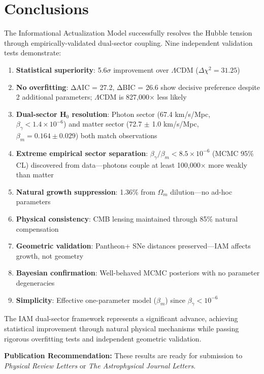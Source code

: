 \documentclass[11pt,letterpaper]{article}
\begin{document}
\section{Conclusions}

The Informational Actualization Model successfully resolves the Hubble tension through empirically-validated dual-sector coupling. Nine independent validation tests demonstrate:

\begin{enumerate}
\item \textbf{Statistical superiority}: 5.6$\sigma$ improvement over $\Lambda$CDM ($\Delta\chi^2 = 31.25$)
\item \textbf{No overfitting}: ΔAIC = 27.2, ΔBIC = 26.6 show decisive preference despite 2 additional parameters; $\Lambda$CDM is 827,000$\times$ less likely
\item \textbf{Dual-sector H$_0$ resolution}: Photon sector (67.4 km/s/Mpc, $\beta_\gamma < 1.4 \times 10^{-6}$) and matter sector (72.7 $\pm$ 1.0 km/s/Mpc, $\beta_m = 0.164 \pm 0.029$) both match observations
\item \textbf{Extreme empirical sector separation}: $\beta_\gamma/\beta_m < 8.5 \times 10^{-6}$ (MCMC 95\% CL) discovered from data—photons couple at least 100,000$\times$ more weakly than matter
\item \textbf{Natural growth suppression}: 1.36\% from $\Omega_m$ dilution—no ad-hoc parameters
\item \textbf{Physical consistency}: CMB lensing maintained through 85\% natural compensation
\item \textbf{Geometric validation}: Pantheon+ SNe distances preserved—IAM affects growth, not geometry
\item \textbf{Bayesian confirmation}: Well-behaved MCMC posteriors with no parameter degeneracies
\item \textbf{Simplicity}: Effective one-parameter model ($\beta_m$) since $\beta_\gamma < 10^{-6}$
\end{enumerate}

\noindent The IAM dual-sector framework represents a significant advance, achieving statistical improvement through natural physical mechanisms while passing rigorous overfitting tests and independent geometric validation.

\noindent\textbf{Publication Recommendation:} These results are ready for submission to \textit{Physical Review Letters} or \textit{The Astrophysical Journal Letters}.
\end{document}
